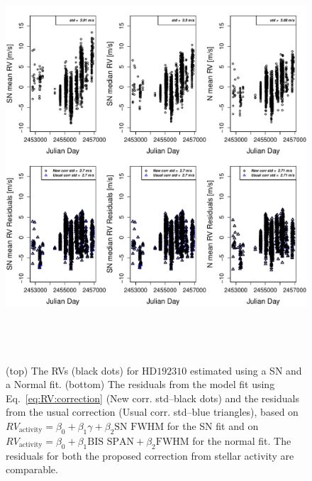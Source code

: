 \documentclass{aa}
\begin{document}
\begin{figure} 
\begin{center}
\includegraphics[height = 6in]{NEW_CORRECTIONHD19231_[3]CorrectionActivity_RadialVelocity_vs_time.pdf} 
   \caption{(top) The RVs (black dots) for $\text{HD}192310$ estimated using a SN and a Normal fit.
 (bottom) The residuals from the model fit using Eq.~\ref{eq:RV:correction} (New corr. std--black dots) and the residuals from the usual correction (Usual corr. std--blue triangles), based on $RV_{\text{activity}}=\beta_0+\beta_1 \gamma + \beta_2 \text{SN FWHM}$ for the SN fit and on $RV_{\text{activity}}=\beta_0+\beta_1 \text{BIS SPAN} + \beta_2 \text{FWHM}$ for the normal fit. The residuals for both the proposed correction from stellar activity are comparable.}
   \label{fig:HD192310:correctionRV}
\end{center}
\end{figure}
\end{document}
